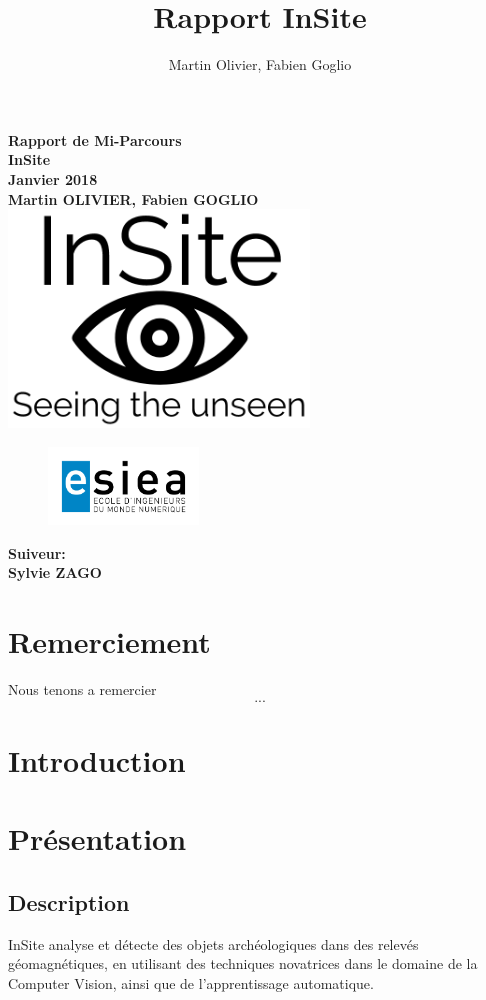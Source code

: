\documentclass[a4paper, 12pt, titlepage, oneside, french]{article}
\author{Martin Olivier, Fabien Goglio}
\title{Rapport InSite}
\begin{document}
\begin{titlepage}
	\centering
		\vfill
		    {\bfseries\Large
			Rapport de Mi-Parcours\\
			InSite\\
			Janvier 2018\\
			\vskip2cm
			Martin OLIVIER, Fabien GOGLIO\\
		    }    
		\vfill
		\includegraphics[width=8cm]{Logo_Preview.png}
		\begin{figure}[b]
			\includegraphics[width=4cm]{Logo-ESIEA.jpg}

		\end{figure}
		\vfill
		\hfill {\bfseries\Large
		 Suiveur:\\
		 \hfill Sylvie ZAGO}
\end{titlepage}

\newpage
	\tableofcontents
\newpage
\cleardoublepage
{}
\section{Remerciement}
	Nous tenons a remercier \[...\]
	\newpage
\section{Introduction}
	\newpage
\section{Présentation}
	\subsection{Description}
		InSite analyse et détecte des objets archéologiques dans des relevés géomagnétiques, en utilisant des techniques novatrices dans le domaine de
		la Computer Vision, ainsi que de l'apprentissage automatique.
\end{document}
